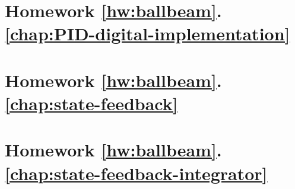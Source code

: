 %		 

	\section*{
		Homework \ref{hw:ballbeam}.\ref{chap:PID-digital-implementation}}  \label{hw:ballbeam_digital_PID}
		
	\section*{
		Homework \ref{hw:ballbeam}.\ref{chap:state-feedback}}  \label{hw:ballbeam_state_feedback}
		
	\section*{
		Homework \ref{hw:ballbeam}.\ref{chap:state-feedback-integrator}}  \label{hw:ballbeam_integrator_state_feedback}
		
